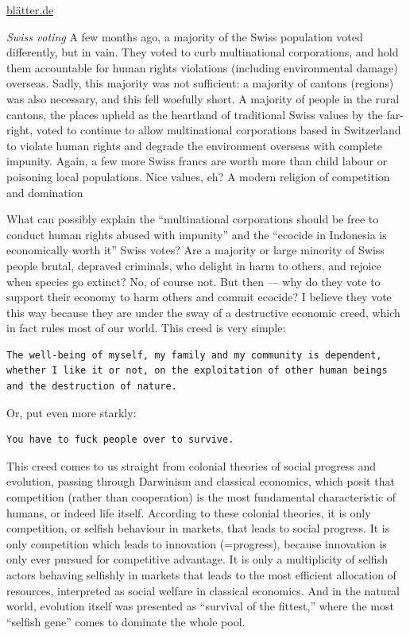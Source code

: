 \documentclass[
]{book}
\begin{document}
\href{https://www.blaetter.de/ausgabe/2017/mai/unsere-schoene-imperiale-lebensweise}{blätter.de}

\emph{Swiss voting}
A few months ago, a majority of the Swiss population voted differently, but in vain. They voted to curb multinational corporations, and hold them accountable for human rights violations (including environmental damage) overseas. Sadly, this majority was not sufficient: a majority of cantons (regions) was also necessary, and this fell woefully short. A majority of people in the rural cantons, the places upheld as the heartland of traditional Swiss values by the far-right, voted to continue to allow multinational corporations based in Switzerland to violate human rights and degrade the environment overseas with complete impunity. Again, a few more Swiss francs are worth more than child labour or poisoning local populations. Nice values, eh?
A modern religion of competition and domination

What can possibly explain the ``multinational corporations should be free to conduct human rights abused with impunity'' and the ``ecocide in Indonesia is economically worth it'' Swiss votes? Are a majority or large minority of Swiss people brutal, depraved criminals, who delight in harm to others, and rejoice when species go extinct? No, of course not. But then --- why do they vote to support their economy to harm others and commit ecocide? I believe they vote this way because they are under the sway of a destructive economic creed, which in fact rules most of our world. This creed is very simple:

\begin{verbatim}
The well-being of myself, my family and my community is dependent, whether I like it or not, on the exploitation of other human beings and the destruction of nature.
\end{verbatim}

Or, put even more starkly:

\begin{verbatim}
You have to fuck people over to survive.
\end{verbatim}

This creed comes to us straight from colonial theories of social progress and evolution, passing through Darwinism and classical economics, which posit that competition (rather than cooperation) is the most fundamental characteristic of humans, or indeed life itself. According to these colonial theories, it is only competition, or selfish behaviour in markets, that leads to social progress. It is only competition which leads to innovation (=progress), because innovation is only ever pursued for competitive advantage. It is only a multiplicity of selfish actors behaving selfishly in markets that leads to the most efficient allocation of resources, interpreted as social welfare in classical economics. And in the natural world, evolution itself was presented as ``survival of the fittest,'' where the most ``selfish gene'' comes to dominate the whole pool.
\end{document}
